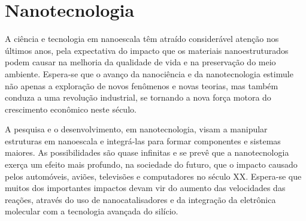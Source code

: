 \documentclass[10pt]{scrartcl}
\author{fabio}
\date{\today}
\title{}
\def\disciplina{Química}
\begin{document}
\twocolumn[

%






\smallbreak
\medbreak
\par\vspace{2ex}]%


\section{Nanotecnologia}
\label{sec:org91508c5}
A ciência e tecnologia em nanoescala têm atraído considerável atenção nos últimos anos, pela expectativa do impacto que os materiais nanoestruturados podem causar na melhoria da qualidade de vida e na preservação do meio ambiente. Espera-se que o avanço da nanociência e da nanotecnologia estimule não apenas a exploração de novos fenômenos e novas teorias, mas também conduza a uma revolução industrial, se tornando a nova força motora do crescimento econômico neste século.

A pesquisa e o desenvolvimento, em nanotecnologia, visam a manipular estruturas em nanoescala e integrá-las para formar componentes e sistemas maiores. As possibilidades são quase infinitas e se prevê que a nanotecnologia exerça um efeito mais profundo, na sociedade do futuro, que o impacto causado pelos automóveis, aviões, televisões e computadores no século XX. Espera-se que muitos dos importantes impactos devam vir do aumento das velocidades das reações, através do uso de nanocatalisadores e da integração da eletrônica molecular com a tecnologia avançada do silício.
\end{document}
